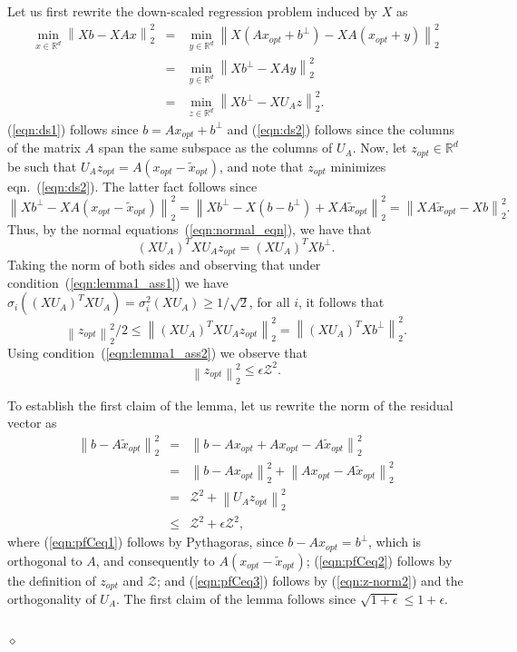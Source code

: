 \documentclass[11pt]{article}
\newcommand{\VTTNormS}[1]{\mbox{}\left\|#1\right\|_2^2}
\newenvironment{Proof}{\noindent {\em Proof:}}{\\\hspace*{\fill}\mbox{$\diamond$}}
\begin{document}
\begin{Proof}
Let us first rewrite the down-scaled regression problem induced by
$X$ as
\begin{eqnarray}
\min_{x \in \mathbb{R}^d} \VTTNormS{ Xb - XAx}
\label{eqn:ds1} &=& \min_{y \in \mathbb{R}^d} \VTTNormS{
X(Ax_{opt}+b^{\perp}) -
XA(x_{opt}+y) }                 \\
\nonumber
  &=& \min_{y \in \mathbb{R}^d} \VTTNormS{ Xb^{\perp} - XAy}    \\
\label{eqn:ds2}
  &=& \min_{z \in \mathbb{R}^d} \VTTNormS{ Xb^{\perp} - XU_Az }.
\end{eqnarray}
(\ref{eqn:ds1}) follows since $b=Ax_{opt}+b^{\perp}$ and (\ref{eqn:ds2}) follows since the columns of the matrix $A$ span the same subspace as the columns of $U_A$. Now, let $z_{opt} \in \mathbb{R}^d$  be such that $U_A z_{opt} = A(x_{opt}-\tilde{x}_{opt})$, and note that $z_{opt}$ minimizes eqn.~(\ref{eqn:ds2}). The latter fact follows since
$$\VTTNormS{Xb^{\perp} - XA(x_{opt}-\tilde{x}_{opt})} =
\VTTNormS{Xb^{\perp} - X(b-b^{\perp}) +
XA\tilde{x}_{opt}} = \VTTNormS{XA\tilde{x}_{opt}
- Xb}.$$
Thus, by the normal equations~(\ref{eqn:normal_eqn}), we have that
\begin{equation*}
\label{eqn:ds-normal} (XU_A)^TXU_A z_{opt} =
(XU_A)^T Xb^{\perp}.
\end{equation*}
Taking the norm of both sides and observing that under condition~(\ref{eqn:lemma1_ass1}) we have $\sigma_i((XU_A)^TXU_A) = \sigma_i^2(XU_A) \ge 1/\sqrt{2}$, for all $i$, it follows that
\begin{equation}
\label{eqn:z-norm1}
  \VTTNormS{z_{opt}} / 2  \le \VTTNormS{(XU_A)^TXU_Az_{opt}} = \VTTNormS{
(XU_A)^T Xb^{\perp} }.
\end{equation}
Using condition~(\ref{eqn:lemma1_ass2}) we observe that
\begin{equation}
\label{eqn:z-norm2}
   \VTTNormS {z_{opt}} \le \epsilon\mathcal{Z}^2.
\end{equation}

\noindent To establish the first claim of the lemma, let us rewrite
the norm of the residual vector as
\begin{eqnarray}
\VTTNormS{ b - A\tilde{x}_{opt} } \nonumber
   &=& \VTTNormS{ b - Ax_{opt} + Ax_{opt} - A\tilde{x}_{opt} }  \\
\label{eqn:pfCeq1}
   &=& \VTTNormS{ b - Ax_{opt} } + \VTTNormS{ Ax_{opt} - A\tilde{x}_{opt} } \\
\label{eqn:pfCeq2}
   &=& \mathcal{Z}^{2} + \VTTNormS{ U_Az_{opt}} \\
\label{eqn:pfCeq3}
   &\leq& \mathcal{Z}^{2} + \epsilon \mathcal{Z}^{2} ,
\end{eqnarray}
where (\ref{eqn:pfCeq1}) follows by Pythagoras, since $b - Ax_{opt}
= b^\perp$, which is orthogonal to $A$, and consequently to
$A(x_{opt} - \tilde{x}_{opt})$; (\ref{eqn:pfCeq2}) follows
by the definition of $z_{opt}$ and $\mathcal{Z}$; and (\ref{eqn:pfCeq3})
follows by (\ref{eqn:z-norm2}) and the orthogonality of $U_A$. The first claim of the lemma follows since
$\sqrt{1+\epsilon} \le 1+\epsilon$.


\end{Proof}
\end{document}
